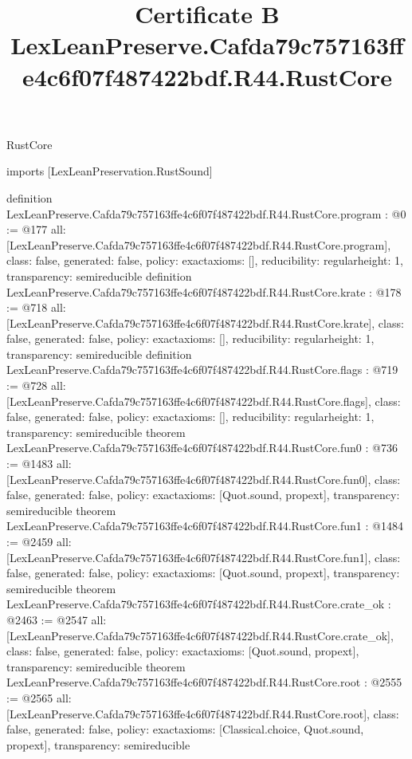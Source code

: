\begin{lexlean}{RustCore}
\title{Certificate B LexLeanPreserve.Cafda79c757163ffe4c6f07f487422bdf.R44.RustCore}
\begin{coremodule}
imports [LexLeanPreservation.RustSound]

definition LexLeanPreserve.Cafda79c757163ffe4c6f07f487422bdf.R44.RustCore.program : @0 := @177 {
  all: [LexLeanPreserve.Cafda79c757163ffe4c6f07f487422bdf.R44.RustCore.program],
  class: false,
  generated: false,
  policy: exact{axioms: []},
  reducibility: regular{height: 1},
  transparency: semireducible
}
definition LexLeanPreserve.Cafda79c757163ffe4c6f07f487422bdf.R44.RustCore.krate : @178 := @718 {
  all: [LexLeanPreserve.Cafda79c757163ffe4c6f07f487422bdf.R44.RustCore.krate],
  class: false,
  generated: false,
  policy: exact{axioms: []},
  reducibility: regular{height: 1},
  transparency: semireducible
}
definition LexLeanPreserve.Cafda79c757163ffe4c6f07f487422bdf.R44.RustCore.flags : @719 := @728 {
  all: [LexLeanPreserve.Cafda79c757163ffe4c6f07f487422bdf.R44.RustCore.flags],
  class: false,
  generated: false,
  policy: exact{axioms: []},
  reducibility: regular{height: 1},
  transparency: semireducible
}
theorem LexLeanPreserve.Cafda79c757163ffe4c6f07f487422bdf.R44.RustCore.fun0 : @736 := @1483 {
  all: [LexLeanPreserve.Cafda79c757163ffe4c6f07f487422bdf.R44.RustCore.fun0],
  class: false,
  generated: false,
  policy: exact{axioms: [Quot.sound, propext]},
  transparency: semireducible
}
theorem LexLeanPreserve.Cafda79c757163ffe4c6f07f487422bdf.R44.RustCore.fun1 : @1484 := @2459 {
  all: [LexLeanPreserve.Cafda79c757163ffe4c6f07f487422bdf.R44.RustCore.fun1],
  class: false,
  generated: false,
  policy: exact{axioms: [Quot.sound, propext]},
  transparency: semireducible
}
theorem LexLeanPreserve.Cafda79c757163ffe4c6f07f487422bdf.R44.RustCore.crate_ok : @2463 := @2547 {
  all: [LexLeanPreserve.Cafda79c757163ffe4c6f07f487422bdf.R44.RustCore.crate_ok],
  class: false,
  generated: false,
  policy: exact{axioms: [Quot.sound, propext]},
  transparency: semireducible
}
theorem LexLeanPreserve.Cafda79c757163ffe4c6f07f487422bdf.R44.RustCore.root : @2555 := @2565 {
  all: [LexLeanPreserve.Cafda79c757163ffe4c6f07f487422bdf.R44.RustCore.root],
  class: false,
  generated: false,
  policy: exact{axioms: [Classical.choice, Quot.sound, propext]},
  transparency: semireducible
}


\end{coremodule}
\end{lexlean}
